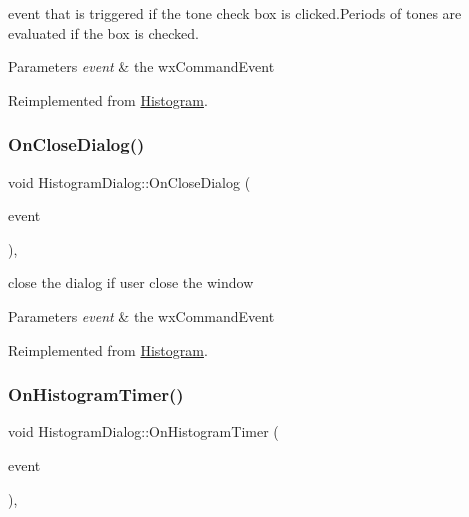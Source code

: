 event that is triggered if the tone check box is clicked.\+Periods of tones are evaluated if the box is checked. 


\begin{DoxyParams}{Parameters}
{\em event} & the wx\+Command\+Event \\
\hline
\end{DoxyParams}


Reimplemented from \hyperlink{classHistogram}{Histogram}.

\mbox{\label{classHistogramDialog_a6a9c1ccefa792e8fdc0c3a846fecbe9b}} 
\subsubsection{\texorpdfstring{On\+Close\+Dialog()}{OnCloseDialog()}}
{\footnotesize\ttfamily void Histogram\+Dialog\+::\+On\+Close\+Dialog (\begin{DoxyParamCaption}\item[{wx\+Command\+Event \&}]{event }\end{DoxyParamCaption})\hspace{0.3cm}{\ttfamily [private]}, {\ttfamily [virtual]}}



close the dialog if user close the window 


\begin{DoxyParams}{Parameters}
{\em event} & the wx\+Command\+Event \\
\hline
\end{DoxyParams}


Reimplemented from \hyperlink{classHistogram}{Histogram}.

\mbox{\label{classHistogramDialog_ac382ffacb7bbd761b95bb08b94517cb1}} 
\subsubsection{\texorpdfstring{On\+Histogram\+Timer()}{OnHistogramTimer()}}
{\footnotesize\ttfamily void Histogram\+Dialog\+::\+On\+Histogram\+Timer (\begin{DoxyParamCaption}\item[{wx\+Timer\+Event \&}]{event }\end{DoxyParamCaption})\hspace{0.3cm}{\ttfamily [private]}, {\ttfamily [virtual]}}



